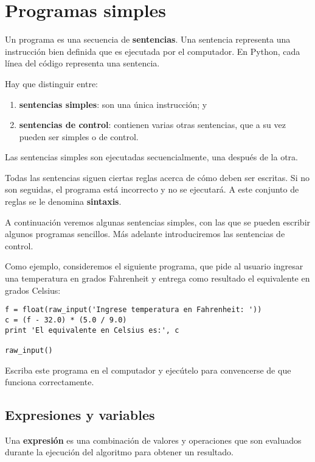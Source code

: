 \chapter{Programas simples}

Un programa es una secuencia de \textbf{sentencias}. Una sentencia
representa una instrucción bien definida que es ejecutada por el
computador. En Python, cada línea del código representa una sentencia.

Hay que distinguir entre:

\begin{enumerate}
\item
  \textbf{sentencias simples}: son una única instrucción; y
\item
  \textbf{sentencias de control}: contienen varias otras sentencias, que
  a su vez pueden ser simples o de control.
\end{enumerate}

Las sentencias simples son ejecutadas secuencialmente, una después de la
otra.

Todas las sentencias siguen ciertas reglas acerca de cómo deben ser
escritas. Si no son seguidas, el programa está incorrecto y no se
ejecutará. A este conjunto de reglas se le denomina \textbf{sintaxis}.

A continuación veremos algunas sentencias simples, con las que se pueden
escribir algunos programas sencillos. Más adelante introduciremos las
sentencias de control.

Como ejemplo, consideremos el siguiente programa, que pide al usuario
ingresar una temperatura en grados Fahrenheit y entrega como resultado
el equivalente en grados Celsius:

\begin{lstlisting}
f = float(raw_input('Ingrese temperatura en Fahrenheit: '))
c = (f - 32.0) * (5.0 / 9.0)
print 'El equivalente en Celsius es:', c

raw_input()
\end{lstlisting}

Escriba este programa en el computador
y ejecútelo para convencerse de que funciona correctamente.

\section{Expresiones y variables}

Una \textbf{expresión} es una combinación de valores y operaciones que
son evaluados durante la ejecución del algoritmo para obtener un
resultado.

